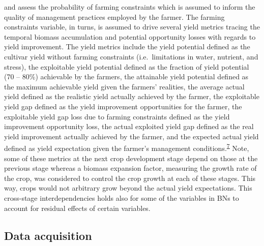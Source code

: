 \documentclass[11pt,preprint]{article}
\begin{document}
and assess the probability of farming constraints which is assumed to
inform the quality of management practices employed by the farmer. The
farming constraints variable, in turns, is assumed to drive several
yield metrics tracing the temporal biomass accumulation and potential
opportunity losses with regards to yield improvement. The yield metrics
include the yield potential defined as the cultivar yield without
farming constraints (i.e.~limitations in water, nutrient, and stress),
the exploitable yield potential defined as the fraction of yield
potential (70 -- 80\%) achievable by the farmers, the attainable yield
potential defined as the maximum achievable yield given the farmers'
realities, the average actual yield defined as the realistic yield
actually achieved by the farmer, the exploitable yield gap defined as
the yield improvement opportunities for the farmer, the exploitable
yield gap loss due to farming constraints defined as the yield
improvement opportunity loss, the actual exploited yield gap defined as
the real yield improvement actually achieved by the farmer, and the
expected actual yield defined as yield expectation given the farmer's
management
conditions.\textsuperscript{\protect\hyperlink{ref-VanIttersum_et_al_2013}{7}}
Note, some of these metrics at the next crop development stage depend on
those at the previous stage whereas a biomass expansion factor,
measuring the growth rate of the crop, was considered to control the
crop growth at each of these stages. This way, crops would not arbitrary
grow beyond the actual yield expectations. This cross-stage
interdependencies holds also for some of the variables in BNs to account
for residual effects of certain variables.

\hypertarget{data-acquisition}{%
\subsection{Data acquisition}\label{data-acquisition}}
\end{document}
